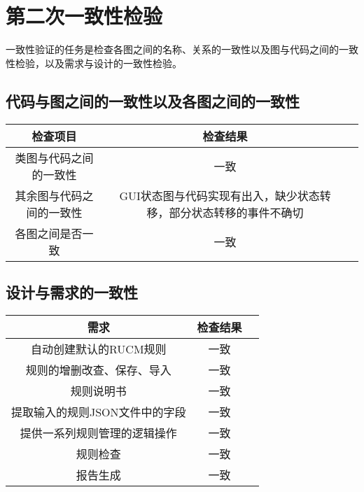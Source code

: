 \chapter{第二次一致性检验}
一致性验证的任务是检查各图之间的名称、关系的一致性以及图与代码之间的一致性检验，以及需求与设计的一致性检验。
\section{代码与图之间的一致性以及各图之间的一致性}
\begin{table}[htbp]
	\begin{tabular}{|c|c|l|}
		\hline
		检查项目       &    检查结果              \\ \hline
		类图与代码之间的一致性        & 一致   \\ \hline
		其余图与代码之间的一致性        &      GUI状态图与代码实现有出入，缺少状态转移，部分状态转移的事件不确切           \\ \hline
		各图之间是否一致   &   一致                    \\ \hline                     
	\end{tabular}
\end{table}
\section{设计与需求的一致性}
\begin{table}[htbp]
	\begin{tabular}{|c|c|l|}
		\hline
		需求       &    检查结果              \\ \hline
		自动创建默认的RUCM规则        & 一致   \\ \hline
		规则的增删改查、保存、导入        &     一致       \\ \hline
		规则说明书   &   一致                    \\ \hline                    
		提取输入的规则JSON文件中的字段   &   一致                    \\ \hline   
		提供一系列规则管理的逻辑操作   &   一致                    \\ \hline   
		规则检查   &   一致                    \\ \hline   
		报告生成   &   一致                    \\ \hline   
	\end{tabular}
\end{table}